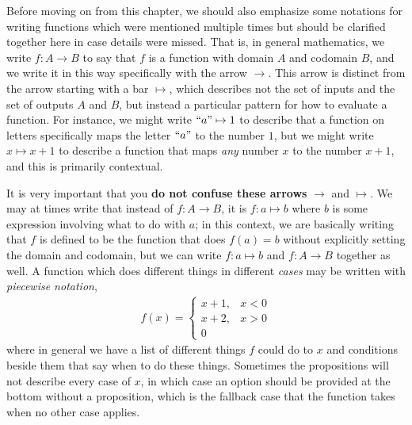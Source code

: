 \documentclass[11pt]{article}
\begin{document}
Before moving on from this chapter, we should also emphasize some notations for writing functions which were mentioned multiple times but should be clarified together here in case details were missed. That is, in general mathematics, we write $f\colon A \to B$ to say that $f$ is a function with domain $A$ and codomain $B$, and we write it in this way specifically with the arrow $\to$. This arrow is distinct from the arrow starting with a bar $\mapsto$, which describes not the set of inputs and the set of outputs $A$ and $B$, but instead a particular pattern for how to evaluate a function. For instance, we might write $``a" \mapsto 1$ to describe that a function on letters specifically maps the letter $``a"$ to the number $1$, but we might write $x \mapsto x + 1$ to describe a function that maps \emph{any} number $x$ to the number $x + 1$, and this is primarily contextual.

It is very important that you \textbf{do not confuse these arrows} $\to$ and $\mapsto$. We may at times write that instead of $f\colon A \to B$, it is $f\colon a \mapsto b$ where $b$ is some expression involving what to do with $a$; in this context, we are basically writing that $f$ is defined to be the function that does $f(a) = b$ without explicitly setting the domain and codomain, but we can write $f\colon a \mapsto b$ and $f\colon A \to B$ together as well. A function which does different things in different \emph{cases} may be written with \emph{piecewise notation}, \begin{gather*}
f(x) = \left\{ \begin{matrix}
	x + 1, & x < 0\\
	x + 2, & x > 0\\
	0
\end{matrix}
 \right.
\end{gather*}
where in general we have a list of different things $f$ could do to $x$ and conditions beside them that say when to do these things. Sometimes the propositions will not describe every case of $x$, in which case an option should be provided at the bottom without a proposition, which is the fallback case that the function takes when no other case applies.
\end{document}
